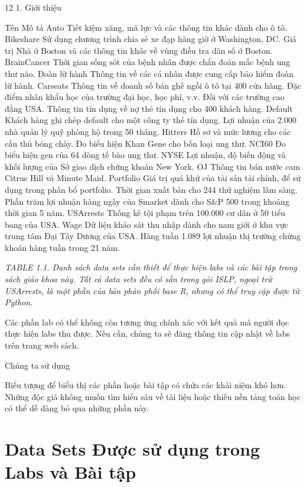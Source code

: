 12 1. Giới thiệu

Tên Mô tả Auto Tiết kiệm xăng, mã lực và các thông tin khác dành cho ô tô. Bikeshare Sử dụng chương trình chia sẻ xe đạp hàng giờ ở Washington, DC. Giá trị Nhà ở Boston và các thông tin khác về vùng điều tra dân số ở Boston. BrainCancer Thời gian sống sót của bệnh nhân được chẩn đoán mắc bệnh ung thư não. Đoàn lữ hành Thông tin về các cá nhân được cung cấp bảo hiểm đoàn lữ hành. Carseats Thông tin về doanh số bán ghế ngồi ô tô tại 400 cửa hàng. Đặc điểm nhân khẩu học của trường đại học, học phí, v.v. Đối với các trường cao đẳng USA. Thông tin tín dụng về nợ thẻ tín dụng cho 400 khách hàng. Default Khách hàng ghi chép default cho một công ty thẻ tín dụng. Lợi nhuận của 2.000 nhà quản lý quỹ phòng hộ trong 50 tháng. Hitters Hồ sơ và mức lương cho các cầu thủ bóng chày. Đo biểu hiện Khan Gene cho bốn loại ung thư. NCI60 Đo biểu hiện gen của 64 dòng tế bào ung thư. NYSE Lợi nhuận, độ biến động và khối lượng của Sở giao dịch chứng khoán New York. OJ Thông tin bán nước cam Citrus Hill và Minute Maid. Portfolio Giá trị quá khứ của tài sản tài chính, để sử dụng trong phân bổ portfolio. Thời gian xuất bản cho 244 thử nghiệm lâm sàng. Phần trăm lợi nhuận hàng ngày của Smarket dành cho S\&P 500 trong khoảng thời gian 5 năm. USArrests Thống kê tội phạm trên 100.000 cư dân ở 50 tiểu bang của USA. Wage Dữ liệu khảo sát thu nhập dành cho nam giới ở khu vực trung tâm Đại Tây Dương của USA. Hàng tuần 1.089 lợi nhuận thị trường chứng khoán hàng tuần trong 21 năm.

\noindent\textit{TABLE 1.1. Danh sách data sets cần thiết để thực hiện labs và các bài tập trong sách giáo khoa này. Tất cả data sets đều có sẵn trong gói ISLP, ngoại trừ USArrests, là một phần của bản phân phối base R, nhưng có thể truy cập được từ Python.}

Các phần lab có thể không còn tương ứng chính xác với kết quả mà người đọc thực hiện labs thu được. Nếu cần, chúng ta sẽ đăng thông tin cập nhật về labs trên trang web sách.

Chúng ta sử dụng

Biểu tượng để biểu thị các phần hoặc bài tập có chứa các khái niệm khó hơn. Những độc giả không muốn tìm hiểu sâu về tài liệu hoặc thiếu nền tảng toán học có thể dễ dàng bỏ qua những phần này.

\section{Data Sets Được sử dụng trong Labs và Bài tập}

